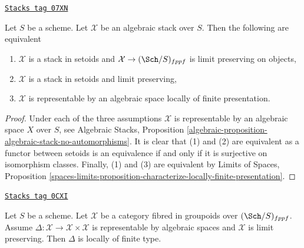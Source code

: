 \begin{lemma}
\label{artin-lemma-limit-preserving-algebraic-space}
\href{https://stacks.math.columbia.edu/tag/07XN}{\texttt{Stacks tag 07XN}}

Let $S$ be a scheme. Let $\mathcal{X}$ be an algebraic stack over $S$.
Then the following are equivalent
\begin{enumerate}
\item $\mathcal{X}$ is a stack in setoids and
$\mathcal{X} \to (\Sch/S)_{fppf}$ is limit preserving on objects,
\item $\mathcal{X}$ is a stack in setoids and limit preserving,
\item $\mathcal{X}$ is representable by an algebraic space
locally of finite presentation.
\end{enumerate}
\end{lemma}

\begin{proof}
Under each of the three assumptions $\mathcal{X}$ is representable
by an algebraic space $X$ over $S$, see Algebraic Stacks, Proposition
\ref{algebraic-proposition-algebraic-stack-no-automorphisms}.
It is clear that (1) and (2) are equivalent as a functor between
setoids is an equivalence if and only if it is surjective on isomorphism
classes. Finally, (1) and (3) are equivalent by
Limits of Spaces, Proposition
\ref{spaces-limits-proposition-characterize-locally-finite-presentation}.
\end{proof}

\begin{lemma}[Diagonal]
\label{artin-lemma-diagonal}
\href{https://stacks.math.columbia.edu/tag/0CXI}{\texttt{Stacks tag 0CXI}}

Let $S$ be a scheme. Let $\mathcal{X}$ be a category fibred
in groupoids over $(\Sch/S)_{fppf}$. Assume
$\Delta : \mathcal{X} \to \mathcal{X} \times \mathcal{X}$ is
representable by algebraic spaces and $\mathcal{X}$ is limit preserving.
Then $\Delta$ is locally of finite type.
\end{lemma}

